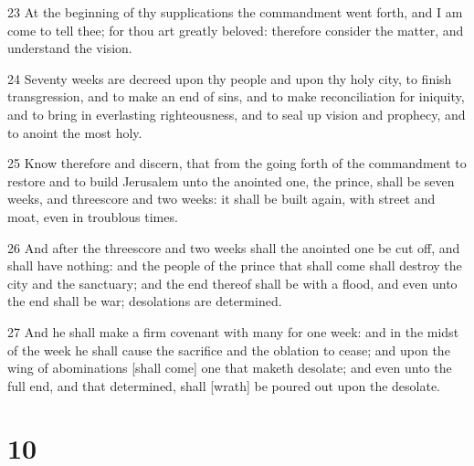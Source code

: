 \par 23 At the beginning of thy supplications the commandment went forth, and I am come to tell thee; for thou art greatly beloved: therefore consider the matter, and understand the vision.
\par 24 Seventy weeks are decreed upon thy people and upon thy holy city, to finish transgression, and to make an end of sins, and to make reconciliation for iniquity, and to bring in everlasting righteousness, and to seal up vision and prophecy, and to anoint the most holy.
\par 25 Know therefore and discern, that from the going forth of the commandment to restore and to build Jerusalem unto the anointed one, the prince, shall be seven weeks, and threescore and two weeks: it shall be built again, with street and moat, even in troublous times.
\par 26 And after the threescore and two weeks shall the anointed one be cut off, and shall have nothing: and the people of the prince that shall come shall destroy the city and the sanctuary; and the end thereof shall be with a flood, and even unto the end shall be war; desolations are determined.
\par 27 And he shall make a firm covenant with many for one week: and in the midst of the week he shall cause the sacrifice and the oblation to cease; and upon the wing of abominations [shall come] one that maketh desolate; and even unto the full end, and that determined, shall [wrath] be poured out upon the desolate.

\chapter{10}

